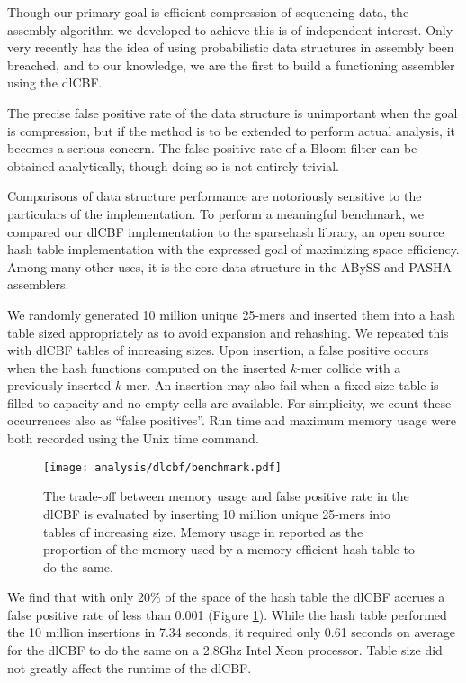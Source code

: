 \documentclass[twocolumn]{article}
\begin{document}
Though our primary goal is efficient compression of sequencing data, the
assembly algorithm we developed to achieve this is of independent interest.
Only very recently has the idea of using probabilistic data structures in
assembly been breached, and to our knowledge, we are the first to build
a functioning assembler using the dlCBF.

The precise false positive rate of the data structure is unimportant when the
goal is compression, but if the method is to be extended to perform actual
analysis, it becomes a serious concern. The false positive rate of a Bloom
filter can be obtained analytically, though doing so is not entirely trivial.

Comparisons of data structure performance are notoriously sensitive to the
particulars of the implementation. To perform a meaningful benchmark, we
compared our dlCBF implementation to the sparsehash library, an open source
hash table implementation with the expressed goal of maximizing space
efficiency. Among many other uses, it is the core data structure in the ABySS
\citep{Simpson2011} and PASHA \citep{Liu2011} assemblers.

We randomly generated 10 million unique 25-mers and inserted them into a hash
table sized appropriately as to avoid expansion and rehashing. We repeated
this with dlCBF tables of increasing sizes. Upon insertion, a false positive
occurs when the hash functions computed on the inserted $k$-mer collide with a
previously inserted $k$-mer. An insertion may also fail when a fixed size
table is filled to capacity and no empty cells are available. For simplicity,
we count these occurrences also as ``false positives''. Run time and maximum memory
usage were both recorded using the Unix time command.

\begin{figure}[h]
\centerline{\texttt{[image: analysis/dlcbf/benchmark.pdf]}}
\caption{
The trade-off between memory usage and false positive rate in the dlCBF is
evaluated by inserting 10 million unique 25-mers into tables of increasing
size. Memory usage in reported as the proportion of the memory used by a
memory efficient hash table to do the same.
}
\label{fig:dlcbf_bench}
\end{figure}

We find that with only 20\% of the space of the hash table the dlCBF accrues a
false positive rate of less than 0.001 (Figure \ref{fig:dlcbf_bench}). While
the hash table performed the 10 million insertions in 7.34 seconds, it
required only 0.61 seconds on average for the dlCBF to do the same on a 2.8Ghz
Intel Xeon processor. Table size did not greatly affect the runtime of the
dlCBF.
\end{document}
